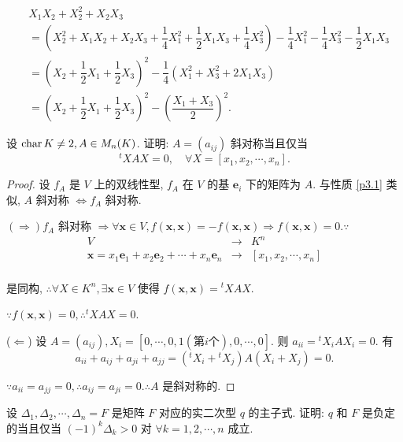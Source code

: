 \documentclass[color=black,device=normal,lang=cn,mode=geye]{elegantnote}
\begin{document}
\begin{solution}
    \begin{align*}
        & X_1X_2+X_2^2+X_2X_3 \\
        & =\left(X_2^2+X_1X_2+X_2X_3+\dfrac{1}{4}X_1^2+\dfrac{1}{2}X_1X_3+\dfrac{1}{4}X_3^2\right)-\dfrac{1}{4}X_1^2-\dfrac{1}{4}X_3^2-\dfrac{1}{2}X_1X_3 \\
        & =\left(X_2+\dfrac{1}{2}X_1+\dfrac{1}{2}X_3\right)^2-\dfrac{1}{4}(X_1^2+X_3^2+2X_1X_3) \\
        & =\left(X_2+\dfrac{1}{2}X_1+\dfrac{1}{2}X_3\right)^2-\left(\dfrac{X_1+X_3}{2}\right)^2.
    \end{align*}
\end{solution}
\begin{exercisec}%
    设 $\operatorname{char}  K\neq 2,A\in M_n(K)$. 证明: $A=(a_{ij})$ 斜对称当且仅当
    \[{}^tXAX=0,\quad\forall X=[x_1,x_2,\cdots,x_n].\]
\end{exercisec}
\begin{proof}
    设 $f_A$ 是 $V$ 上的双线性型, $f_A$ 在 $V$ 的基 $\boldsymbol{e}_i$ 下的矩阵为 $A$. 与性质 \ref{p3.1} 类似, $A$ 斜对称 $\Leftrightarrow f_A$ 斜对称.

    $(\Rightarrow)f_A$ 斜对称 $\Rightarrow\forall\boldsymbol{x}\in V,f(\boldsymbol{x},\boldsymbol{x})=-f(\boldsymbol{x},\boldsymbol{x})\Rightarrow f(\boldsymbol{x},\boldsymbol{x})=0.\because$
    \[\begin{array}{rcl}
        V & \to & K^n \\
        \boldsymbol{x}=x_1\boldsymbol{e}_1+x_2\boldsymbol{e}_2+\cdots+x_n\boldsymbol{e}_n & \to & [x_1,x_2,\cdots,x_n] \\
    \end{array}\]

    是同构, $\therefore\forall X\in K^n,\exists\boldsymbol{x}\in V$ 使得 $f(\boldsymbol{x},\boldsymbol{x})={}^tXAX$.

    $\because f(\boldsymbol{x},\boldsymbol{x})=0,\therefore{}^tXAX=0$.

    ($\Leftarrow$) 设 $A=(a_{ij}),X_i=[0,\cdots,0,1(\text{第}i\text{个}),0,\cdots,0]$. 则 $a_{ii}={}^tX_iAX_i=0$. 有
    \[a_{ii}+a_{ij}+a_{ji}+a_{jj}=({}^tX_i+{}^tX_j)A(X_i+X_j)=0.\]

    $\because a_{ii}=a_{jj}=0,\therefore a_{ij}=a_{ji}=0.\therefore A$ 是斜对称的.
\end{proof}
\begin{exercise}\label{ex4.1}
    设 $\Delta_1,\Delta_2,\cdots,\Delta_n=F$ 是矩阵 $F$ 对应的实二次型 $q$ 的主子式. 证明: $q$ 和 $F$ 是负定的当且仅当 $(-1)^k\Delta_k>0$ 对 $\forall k=1,2,\cdots,n$ 成立.
\end{exercise}
\end{document}

